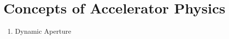 \chapter{Concepts of Accelerator Physics}
\thumbforchapter{}

\begin{enumerate}
    \color{red}
    \item Dynamic Aperture
\end{enumerate}









